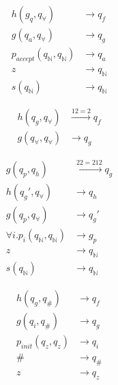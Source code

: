 \begin{lrbox}{\tempboxa}
\begin{minipage}{4cm}
\begin{align*}
  h(g_q, q_\forall) &\rightarrow q_f \\
  g(q_a, q_\forall) &\rightarrow q_g \\
  p_{accept}(q_{\mathbb{N}}, q_{\mathbb{N}}) &\rightarrow q_a \\
  z &\rightarrow q_{\mathbb{N}} \\
  s(q_{\mathbb{N}}) &\rightarrow q_{\mathbb{N}}
\end{align*}
\end{minipage}
\end{lrbox}
\begin{lrbox}{\tempboxb}
\begin{minipage}{3cm}
\begin{align*}
  h(q_g, q_\forall) &\xrightarrow{12=2} q_f \\
  g(q_\forall, q_\forall) &\rightarrow q_g
\end{align*}
\end{minipage}
\end{lrbox}
\begin{lrbox}{\tempboxc}
\begin{minipage}{3cm}
\begin{align*}
  g(q_p, q_h) &\xrightarrow{22=212} q_g \\
  h(q_g', q_\forall) &\rightarrow q_h \\ 
  g(q_p, q_\forall) &\rightarrow q_g' \\
  \forall i . p_i(q_{\mathbb{N}}, q_{\mathbb{N}}) &\rightarrow g_p \\
  z &\rightarrow q_{\mathbb{N}} \\
  s(q_{\mathbb{N}}) &\rightarrow q_{\mathbb{N}}
\end{align*}
\end{minipage}
\end{lrbox}
\begin{lrbox}{\tempboxd}
\begin{minipage}{3cm}
 \begin{align*}
  h(q_g, q_\#) &\rightarrow q_f \\
  g(q_i, q_\#) &\rightarrow q_g \\
  p_{init}(q_z, q_z) &\rightarrow q_i \\
  \# &\rightarrow q_\# \\
  z  &\rightarrow q_z
\end{align*}
\end{minipage}
\end{lrbox}

